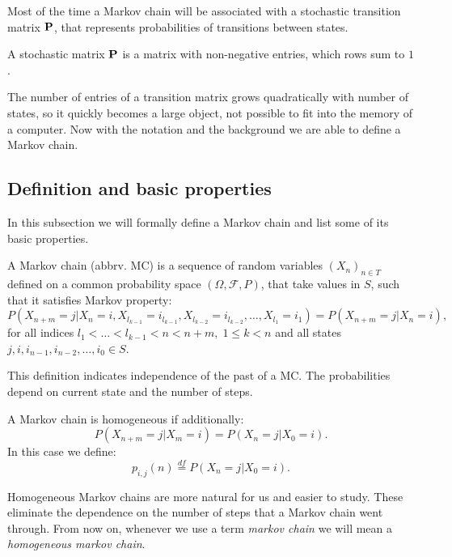 	Most of the time a Markov chain will be associated with a stochastic transition matrix $\mathbf{P}$, that represents probabilities of transitions between states.
	\begin{definition}
		A stochastic matrix $\mathbf{P}$ is a matrix with non-negative entries, which rows sum to $1$.
	\end{definition}
	The number of entries of a transition matrix grows quadratically with number of states, so it quickly becomes a large object, not possible to fit into the memory of a computer. Now with the notation and the background we are able to define a Markov chain.
	
\subsection{Definition and basic properties}
	In this subsection we will formally define a Markov chain and list some of its basic properties.
	
	\begin{definition}
		A Markov chain (abbrv. MC) is a sequence of random variables $\left( X_n\right)_{n \in T}$ defined on a common probability space $\left( \Omega, \mathcal{F}, P \right)$, that take values in $S$, such that it satisfies Markov property:
		\begin{equation*}
			P(X_{n+m} = j | X_n = i, X_{l_{k-1}} = i_{l_{k-1}}, X_{l_{k-2}} = i_{l_{k-2}}, \ldots, X_{l_1} = i_1) = P(X_{n+m} = j | X_n = i),
		\end{equation*}
		for all indices $l_1< \ldots < l_{k-1} < n < n+m, \; 1 \leq k < n$ and all states $j, i, i_{n-1}, i_{n-2}, \ldots, i_0 \in S$.
	\end{definition}
	This definition indicates independence of the past of a MC. The probabilities depend on current state and the number of steps.

	\begin{definition}
		A Markov chain is homogeneous if additionally:
		\begin{equation*}
			P(X_{n+m} = j | X_m = i) = P(X_{n} = j | X_0 = i).
		\end{equation*}
		In this case we define:
		\begin{equation*}
			p_{i,j}(n) \overset{df}{=} P(X_{n} = j | X_0 = i).
		\end{equation*}
	\end{definition}
	Homogeneous Markov chains are more natural for us and easier to study. These eliminate the dependence on the number of steps that a Markov chain went through. From now on, whenever we use a term \textit{markov chain} we will mean a \textit{homogeneous markov chain}.
	
